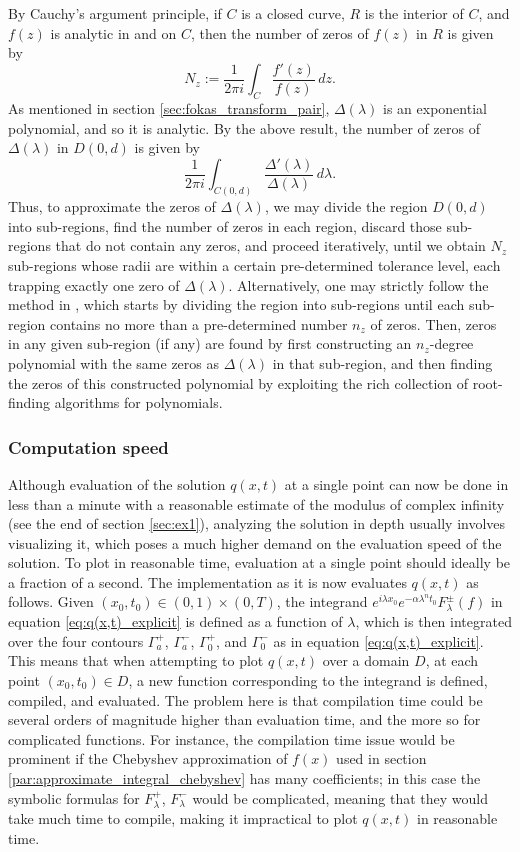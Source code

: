 \documentclass[12pt, oneside, a4paper]{article}
\begin{document}
By Cauchy's argument principle, if $C$ is a closed curve, $R$ is the interior of $C$, and $f(z)$ is analytic in and on $C$, then the number of zeros of $f(z)$ in $R$ is given by
\[N_z := \frac{1}{2\pi i}\int_C \frac{f'(z)}{f(z)}\,dz.\]
As mentioned in section \ref{sec:fokas_transform_pair}, $\Delta(\lambda)$ is an exponential polynomial, and so it is analytic. By the above result, the number of zeros of $\Delta(\lambda)$ in $D(0,d)$ is given by
\[\frac{1}{2\pi i}\int_{C(0,d)} \frac{\Delta'(\lambda)}{\Delta(\lambda)}\,d\lambda.\]
Thus, to approximate the zeros of $\Delta(\lambda)$, we may divide the region $D(0,d)$ into sub-regions, find the number of zeros in each region, discard those sub-regions that do not contain any zeros, and proceed iteratively, until we obtain $N_z$ sub-regions whose radii are within a certain pre-determined tolerance level, each trapping exactly one zero of $\Delta(\lambda)$. Alternatively, one may strictly follow the method in \cite{Delves1967}, which starts by dividing the region into sub-regions until each sub-region contains no more than a pre-determined number $n_z$ of zeros. Then, zeros in any given sub-region (if any) are found by first constructing an $n_z$-degree polynomial with the same zeros as $\Delta(\lambda)$ in that sub-region, and then finding the zeros of this constructed polynomial by exploiting the rich collection of root-finding algorithms for polynomials.

\subsubsection{Computation speed}

Although evaluation of the solution $q(x,t)$ at a single point can now be done in less than a minute with a reasonable estimate of the modulus of complex infinity (see the end of section \ref{sec:ex1}), analyzing the solution in depth usually involves visualizing it, which poses a much higher demand on the evaluation speed of the solution. To plot in reasonable time, evaluation at a single point should ideally be a fraction of a second. The implementation as it is now evaluates $q(x,t)$ as follows. Given $(x_0, t_0)\in (0,1)\times (0,T)$, the integrand $e^{i\lambda x_0}e^{-\alpha \lambda^n t_0}F_\lambda^\pm(f)$ in equation \eqref{eq:q(x,t)_explicit} is defined as a function of $\lambda$, which is then integrated over the four contours $\Gamma_a^+$, $\Gamma_a^-$, $\Gamma_0^+$, and $\Gamma_0^-$ as in equation \eqref{eq:q(x,t)_explicit}. This means that when attempting to plot $q(x,t)$ over a domain $D$, at each point $(x_0, t_0)\in D$, a new function corresponding to the integrand is defined, compiled, and evaluated. The problem here is that compilation time could be several orders of magnitude higher than evaluation time, and the more so for complicated functions. For instance, the compilation time issue would be prominent if the Chebyshev approximation of $f(x)$ used in section \ref{par:approximate_integral_chebyshev} has many coefficients; in this case the symbolic formulas for $F_\lambda^+$, $F_\lambda^-$ would be complicated, meaning that they would take much time to compile, making it impractical to plot $q(x,t)$ in reasonable time.
\end{document}
